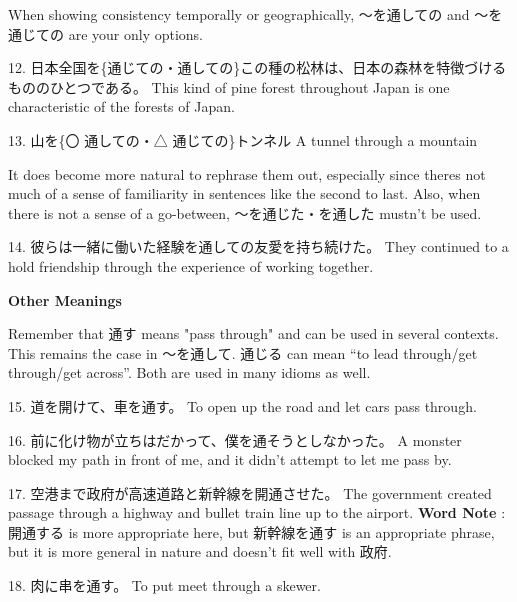 \par{ When showing consistency temporally or geographically, ～を通しての and ～を通じての are your only options. }

\par{12. 日本全国を\{通じての・通しての\}この種の松林は、日本の森林を特徴づけるもののひとつである。 \hfill\break
This kind of pine forest throughout Japan is one characteristic of the forests of Japan. }

\par{13. 山を\{〇 通しての・△ 通じての\}トンネル \hfill\break
A tunnel through a mountain }

\par{ It does become more natural to rephrase them out, especially since there\textquotesingle s not much of a sense of familiarity in sentences like the second to last. Also, when there is not a sense of a go-between, ～を通じた・を通した mustn't be used. }

\par{14. 彼らは一緒に働いた経験を通しての友愛を持ち続けた。 \hfill\break
They continued to a hold friendship through the experience of working together. }

\begin{center}
 \textbf{Other Meanings }
\end{center}

\par{ Remember that 通す means "pass through" and can be used in several contexts. This remains the case in ～を通して. 通じる can mean “to lead through\slash get through\slash get across”. Both are used in many idioms as well. }

\par{15. 道を開けて、車を通す。 \hfill\break
To open up the road and let cars pass through. }

\par{16. 前に化け物が立ちはだかって、僕を通そうとしなかった。 \hfill\break
A monster blocked my path in front of me, and it didn't attempt to let me pass by. }

\par{17. 空港まで政府が高速道路と新幹線を開通させた。 \hfill\break
The government created passage through a highway and bullet train line up to the airport. \hfill\break
 \hfill\break
\textbf{Word Note }: 開通する is more appropriate here, but 新幹線を通す is an appropriate phrase, but it is more general in nature and doesn't fit well with 政府. }

\par{18. 肉に串を通す。 \hfill\break
To put meet through a skewer. }

